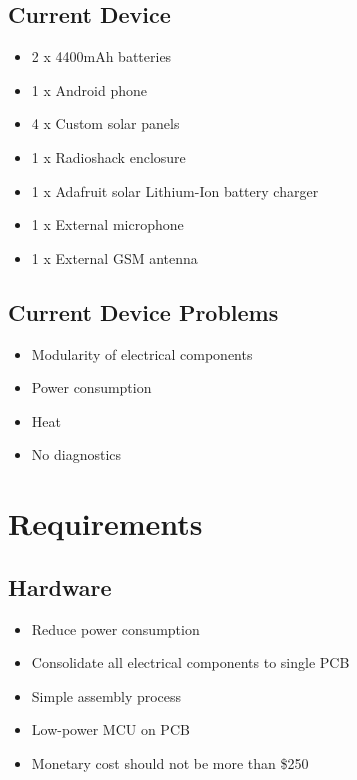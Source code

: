 \documentclass{article}
\numberwithin{figure}{section}
\numberwithin{equation}{section}
\begin{document}
{\subsection{Current Device}
\begin{itemize}
    \item 2 x 4400mAh batteries
    \item 1 x Android phone
    \item 4 x Custom solar panels
    \item 1 x Radioshack enclosure
    \item 1 x Adafruit solar Lithium-Ion battery charger
    \item 1 x External microphone
    \item 1 x External GSM antenna
\end{itemize}

\subsection{Current Device Problems}
\begin{itemize}
    \item Modularity of electrical components
    \item Power consumption
    \item Heat
    \item No diagnostics
\end{itemize}

\newpage

\section{Requirements}
\subsection{Hardware}
\begin{itemize}
    \item Reduce power consumption
    \item Consolidate all electrical components to single PCB
    \item Simple assembly process
    \item Low-power MCU on PCB
    \item Monetary cost should not be more than \$250
\end{itemize}

}
\end{document}
